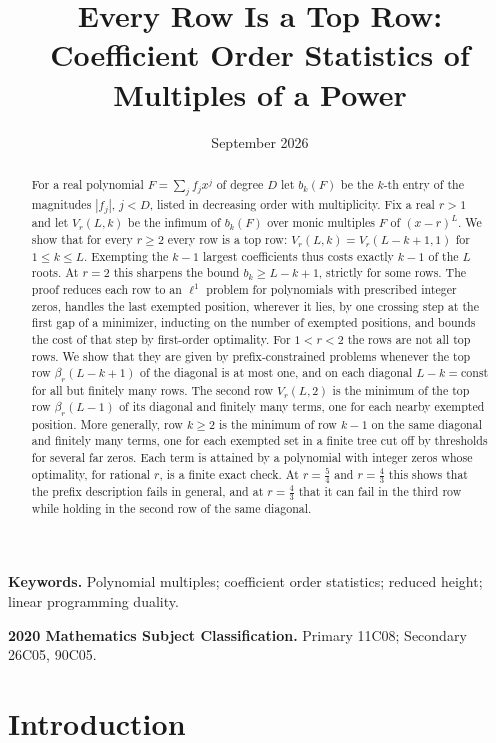 \documentclass[11pt]{article}
\title{Every Row Is a Top Row: Coefficient Order Statistics of Multiples of a Power}
\author{\shortstack{Bangyen Pham\\
\small Independent Researcher\\
\small\href{mailto:bangyenp@gmail.com}{\texttt{bangyenp@gmail.com}}\\
\small\href{https://orcid.org/0009-0006-9928-2088}{ORCID: 0009-0006-9928-2088}}}
\date{September 2026}
\begin{document}
\maketitle

\begin{abstract}
For a real polynomial $F=\sum_jf_jx^j$ of degree $D$ let $b_k(F)$ be the
$k$-th entry of the magnitudes $|f_j|$, $j<D$, listed in decreasing order
with multiplicity.  Fix
a real $r>1$ and let $V_r(L,k)$ be the infimum of $b_k(F)$ over monic
multiples $F$ of $(x-r)^L$.  We show that for every $r\ge2$ every row is a
top row: $V_r(L,k)=V_r(L-k+1,1)$ for $1\le k\le L$.  Exempting the $k-1$
largest coefficients thus costs exactly $k-1$ of the $L$ roots.  At $r=2$
this sharpens the bound $b_k\ge L-k+1$, strictly for some rows.  The proof reduces each row to an
$\ell^1$ problem for polynomials with prescribed integer zeros, handles the last
exempted position, wherever it lies, by one crossing step at the first gap of
a minimizer, inducting on the number of exempted positions,
and bounds the cost of that step by first-order optimality.  For $1<r<2$ the
rows are not all top rows.  We show that they are given by
prefix-constrained problems whenever the top row $\beta_r(L-k+1)$ of the diagonal is at most one, and on each diagonal $L-k=\mathrm{const}$ for all but finitely many
rows.  The second row $V_r(L,2)$ is the minimum of the top row $\beta_r(L-1)$ of its diagonal and finitely many terms, one
for each nearby exempted position.  More generally, row $k\ge2$ is the minimum
of row $k-1$ on the same diagonal and finitely many terms, one for each
exempted set in a finite tree cut off by thresholds for several far zeros.
Each term is attained by a polynomial with integer zeros whose optimality, for
rational $r$, is a finite exact check.  At $r=\frac54$ and $r=\frac43$ this shows that the
prefix description fails in general, and at $r=\frac43$ that it can fail in
the third row while holding in the second row of the same diagonal.
\end{abstract}

\noindent\textbf{Keywords.} Polynomial multiples; coefficient order
statistics; reduced height; linear programming duality.

\noindent\textbf{2020 Mathematics Subject Classification.} Primary 11C08; Secondary 26C05, 90C05.

\section{Introduction}
\end{document}
